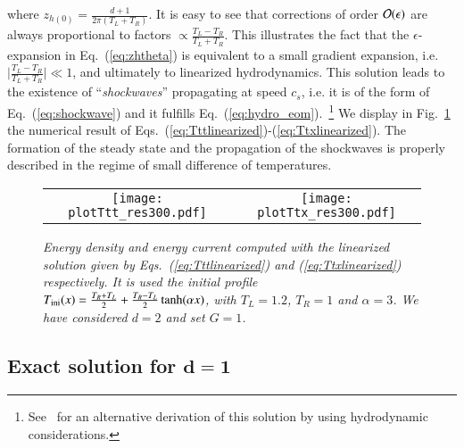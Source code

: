\documentclass[epj]{webofc}
\newcommand{\ini}{{\rm \mbox{{\scriptsize  ini}}}}
\begin{document}
where $z_{h(0)} = \frac{d+1}{2\pi (T_L + T_R)}$. It is easy to see that corrections of order ${\cal O}(\epsilon)$ are always proportional to factors $\propto \frac{T_L - T_R}{T_L + T_R}$. This illustrates the fact that the $\epsilon$-expansion in Eq.~(\ref{eq:zhtheta}) is equivalent to a small gradient expansion, i.e. $\Big|\frac{T_L - T_R}{T_L + T_R}\Big| \ll 1$, and ultimately to linearized hydrodynamics. This solution leads to the existence of ``{\it shockwaves}'' propagating at speed $c_s$, i.e. it is of the form of Eq.~(\ref{eq:shockwave}) and it fulfills Eq.~(\ref{eq:hydro_eom}).~\footnote{See~\cite{Smoller:1993,Chang:2013gba} for an alternative derivation of this solution by using hydrodynamic considerations.} We display in Fig.~\ref{fig:background5} the numerical result of Eqs.~(\ref{eq:Tttlinearized})-(\ref{eq:Ttxlinearized}). The formation of the steady state and the propagation of the shockwaves is properly described in the regime of small difference of temperatures.

\begin{figure*}[t]
\begin{tabular}{cc}
\texttt{[image: plotTtt\_res300.pdf]} & 
\texttt{[image: plotTtx\_res300.pdf]}
\end{tabular}
\caption{\it Energy density and energy current computed with the linearized solution given by Eqs.~(\ref{eq:Tttlinearized}) and (\ref{eq:Ttxlinearized}) respectively. It is used the initial profile~$T_{\ini}(x) = \frac{T_R + T_L}{2} + \frac{T_R-T_L}{2}\tanh(\alpha x)$, with $T_L = 1.2$, $T_R=1$ and $\alpha=3$. We have considered $d=2$ and set $G=1$.}
\label{fig:background5}
\end{figure*}



\subsection{Exact solution for $\mathbf{d=1}$}
\label{subsec:d2}
\end{document}
